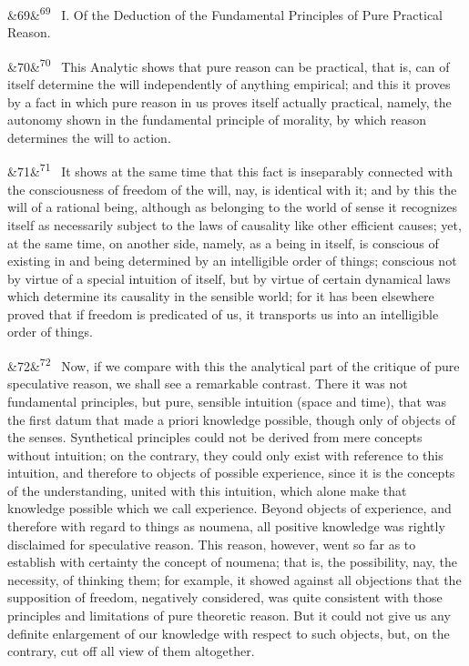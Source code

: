 \documentclass[12pt]{article}
\newcommand{\para}[1][]{\par\noindent\ifx&#1&\else\textsuperscript{\footnotesize #1}~\fi}
\begin{document}
\para[69] I. Of the Deduction of the Fundamental Principles of Pure Practical Reason.

\para[70] This Analytic shows that pure reason can be practical, that is, can of itself determine the will independently of anything empirical; and this it proves by a fact in which pure reason in us proves itself actually practical, namely, the autonomy shown in the fundamental principle of morality, by which reason determines the will to action.

\para[71] It shows at the same time that this fact is inseparably connected with the consciousness of freedom of the will, nay, is identical with it; and by this the will of a rational being, although as belonging to the world of sense it recognizes itself as necessarily subject to the laws of causality like other efficient causes; yet, at the same time, on another side, namely, as a being in itself, is conscious of existing in and being determined by an intelligible order of things; conscious not by virtue of a special intuition of itself, but by virtue of certain dynamical laws which determine its causality in the sensible world; for it has been elsewhere proved that if freedom is predicated of us, it transports us into an intelligible order of things.

\para[72] Now, if we compare with this the analytical part of the critique of pure speculative reason, we shall see a remarkable contrast. There it was not fundamental principles, but pure, sensible intuition (space and time), that was the first datum that made a priori knowledge possible, though only of objects of the senses. Synthetical principles could not be derived from mere concepts without intuition; on the contrary, they could only exist with reference to this intuition, and therefore to objects of possible experience, since it is the concepts of the understanding, united with this intuition, which alone make that knowledge possible which we call experience. Beyond objects of experience, and therefore with regard to things as noumena, all positive knowledge was rightly disclaimed for speculative reason. This reason, however, went so far as to establish with certainty the concept of noumena; that is, the possibility, nay, the necessity, of thinking them; for example, it showed against all objections that the supposition of freedom, negatively considered, was quite consistent with those principles and limitations of pure theoretic reason. But it could not give us any definite enlargement of our knowledge with respect to such objects, but, on the contrary, cut off all view of them altogether.
\end{document}
